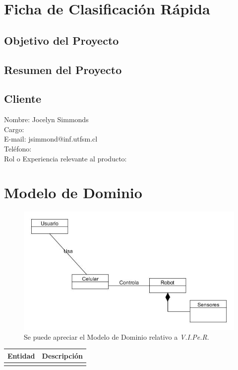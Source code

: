 \documentclass[letterpaper,12pt]{article} %
\numberwithin{equation}{section} %
\numberwithin{figure}{section} %
\numberwithin{table}{section} %
\begin{document}
\setcounter{page}{1} %

\tableofcontents
\newpage

\section{Ficha de Clasificaci\'on R\'apida}
\subsection{Objetivo del Proyecto} %
\subsection{Resumen del Proyecto} %
\subsection{Cliente}
Nombre: Jocelyn Simmonds\\
Cargo: \\
E-mail: jsimmond@inf.utfsm.cl\\
Tel\'efono: \\
Rol o Experiencia relevante al producto:

\newpage
\section{Modelo de Dominio}

\begin{figure}
   \centering
     \includegraphics[scale=0.5]{ModeloDominio.jpg}
   \caption{Se puede apreciar el Modelo de Dominio relativo a \emph{V.I.Pe.R}.}
   \label{fig:ModeloDominio}
\end{figure}


\begin{table}[hb!]
  \begin{tabular}{lp{7cm}}\hline
    Entidad & Descripci\'on \\ \hline \hline %
    & \\ \hline
  \end{tabular}
\end{table}
\end{document}
